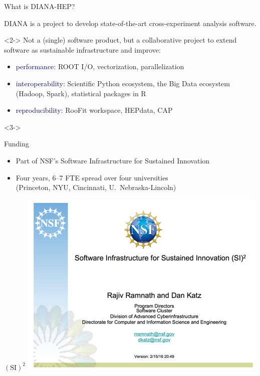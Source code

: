 \documentclass{beamer}
\begin{document}
\begin{frame}{What is DIANA-HEP?}

\begin{block}{}
\vspace{-0.25 cm}
DIANA is a project to develop state-of-the-art cross-experiment analysis software.

\vspace{0.25 cm}
\begin{uncoverenv}<2->
Not a (single) software product, but a collaborative project to extend software as sustainable infrastructure and improve:
\begin{itemize}
\item \textcolor{darkblue}{performance:} ROOT I/O, vectorization, parallelization
\item \textcolor{darkblue}{interoperability:} Scientific Python ecosystem, the Big Data ecosystem (Hadoop, Spark), statistical packages in R
\item \textcolor{darkblue}{reproducibility:} RooFit workspace, HEPdata, CAP
\end{itemize}
\end{uncoverenv}
\end{block}

\begin{uncoverenv}<3->
\begin{block}{Funding}
\begin{itemize}
\item Part of NSF's Software Infrastructure for Sustained Innovation
\item Four years, 6--7 FTE spread over four universities \\ (Princeton, NYU, Cincinnati, U.\ Nebraska-Lincoln)
\end{itemize}
\end{block}
\end{uncoverenv}
\end{frame}

\begin{frame}{$(\mbox{SI})^2$}
\vspace{0.4 cm}
\includegraphics[width=\linewidth]{si2_cover.png}
\end{frame}
\end{document}
